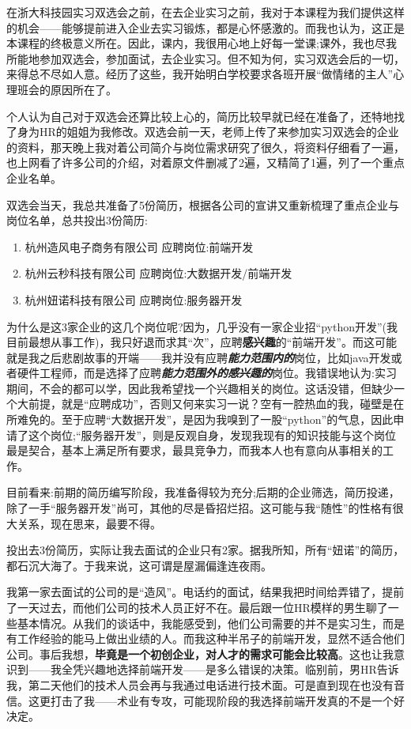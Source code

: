 \documentclass[	10pt，a4paper， UTF8]{ctexart}
\begin{document}
在浙大科技园实习双选会之前，在去企业实习之前，我对于本课程为我们提供这样的机会——能够提前进入企业去实习锻炼，都是心怀感激的。而我也认为，这正是本课程的终极意义所在。因此，课内，我很用心地上好每一堂课;课外，我也尽我所能地参加双选会，参加面试，去企业实习。但不知为何，实习双选会后的一切，来得总不尽如人意。经历了这些，我开始明白学校要求各班开展“做情绪的主人”心理班会的原因所在了。

个人认为自己对于双选会还算比较上心的，简历比较早就已经在准备了，还特地找了身为HR的姐姐为我修改。双选会前一天，老师上传了来参加实习双选会的企业的资料，那天晚上我对着公司简介与岗位需求研究了很久，将资料仔细看了一遍，也上网看了许多公司的介绍，对着原文件删减了2遍，又精简了1遍，列了一个重点企业名单。

双选会当天，我总共准备了5份简历，根据各公司的宣讲又重新梳理了重点企业与岗位名单，总共投出3份简历:

\begin{enumerate}
\item 杭州造风电子商务有限公司 \space 应聘岗位:前端开发
\item 杭州云秒科技有限公司    \space \space \space \space \space \space \space 应聘岗位:大数据开发/前端开发
\item 杭州妞诺科技有限公司    \space \space \space \space \space \space \space 应聘岗位:服务器开发
\end{enumerate}

为什么是这3家企业的这几个岗位呢?因为，几乎没有一家企业招“python开发”(我目前最想从事工作)，我只好退而求其“次”，应聘\textbf{感兴趣}的“前端开发”。而这可能就是我之后悲剧故事的开端——我并没有应聘\textbf{\textit{能力范围内的}}岗位，比如java开发或者硬件工程师，而是选择了应聘\textbf{\textit{能力范围外的感兴趣的}}岗位。我错误地认为:实习期间，不会的都可以学，因此我希望找一个兴趣相关的岗位。这话没错，但缺少一个大前提，就是“应聘成功”，否则又何来实习一说？空有一腔热血的我，碰壁是在所难免的。至于应聘“大数据开发”，是因为我嗅到了一股“python”的气息，因此申请了这个岗位;“服务器开发”，则是反观自身，发现我现有的知识技能与这个岗位最是契合，基本上满足所有要求，最具竞争力，而我本人也有意向从事相关的工作。

目前看来:前期的简历编写阶段，我准备得较为充分;后期的企业筛选，简历投递，除了一手“服务器开发”尚可，其他的尽是昏招烂招。这可能与我“随性”的性格有很大关系，现在思来，最要不得。

投出去3份简历，实际让我去面试的企业只有2家。据我所知，所有“妞诺”的简历，都石沉大海了。于我来说，这可谓是屋漏偏逢连夜雨。

我第一家去面试的公司的是“造风”。电话约的面试，结果我把时间给弄错了，提前了一天过去，而他们公司的技术人员正好不在。最后跟一位HR模样的男生聊了一些基本情况。从我们的谈话中，我能感受到，他们公司需要的并不是实习生，而是有工作经验的能马上做出业绩的人。而我这种半吊子的前端开发，显然不适合他们公司。事后我想，\textbf{毕竟是一个初创企业，对人才的需求可能会比较高}。这也让我意识到——我全凭兴趣地选择前端开发——是多么错误的决策。临别前，男HR告诉我，第二天他们的技术人员会再与我通过电话进行技术面。可是直到现在也没有音信。这更打击了我——术业有专攻，可能现阶段的我选择前端开发真的不是一个好决定。
\end{document}
